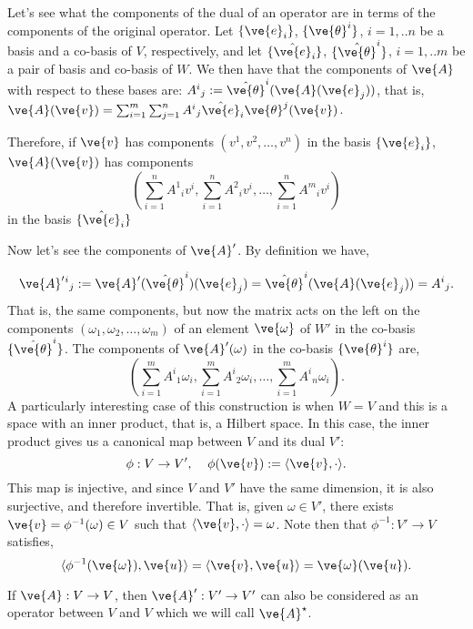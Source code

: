 {Let's see what the components of the dual of an operator are in terms of
the components of the original operator. 
Let $\{\ve{e}_i\}$, $\{\ve{\theta}^i\}$, $i=1,..n$ be a basis and a co-basis of $V$, respectively, and let $\{\hat{\ve{e}}_i\}$, $\{\hat{\ve{\theta}}^i\}$, 
$i=1,..m$
be a pair of basis and co-basis of $W$.
We then have that the components of $\ve{A}$ with respect to these bases
are: 
$A^i{}_j := \hat{\ve{\theta}}^i(\ve{A}(\ve{e}_j))$, 
that is,
$\ve{A}(\ve{v}) = 
\sum_{i=1}^{m} \sum_{j=1}^{n} A^i{}_j \hat{\ve{e}}_i\ve{\theta}^j(\ve{v})$.

Therefore, if $\ve{v}$ has components $(v^1,v^2,\dots,v^n)$ in the 
basis $\{\ve{e}_i\}$, $\ve{A}(\ve{v})$ has components 
\[
\left(\sum_{i=1}^{n} A^1{}_iv^i, \sum_{i=1}^{n} A^2{}_iv^i,\dots,\sum_{i=1}^{n} A^m{}_iv^i\right)
\]
%
 in the basis $\{\hat{\ve{e}}_i\}$

Now let's see the components of $\ve{A}'$. 
By definition we have,

\[
\ve{A}'{}^i{}_j := \ve{A}'(\hat{\ve{\theta}}^i)(\ve{e}_j) 
                  =  \hat{\ve{\theta}}^i(\ve{A}(\ve{e}_j)) = A^i{}_j.
\]
That is, the same components, but now the matrix acts on the left on
the components $(\omega_1,\omega_2,\dots, \omega_m)$ of an element 
$\ve{\omega}$ of $W'$ in the co-basis $\{\hat{\ve{\theta}}^i\}$.
The components of $\ve{A}'(\omega)$ in the co-basis $\{\ve{\theta}^i\}$ are,
\[ 
\left(\sum_{i=1}^{m}A^i{}_1\omega_i, \sum_{i=1}^{m}A^i{}_2\omega_i,\dots,\sum_{i=1}^{m}A^i{}_n\omega_i\right).
\]
%
A particularly interesting case of this construction is when
$W=V$ and this is a space with an inner product, that is, a 
Hilbert space. In this case, the inner product gives us a canonical map between
$V$ and its dual $V'$:
\begin{equation}
  \label{eq:mapa_canonico}
  \phi:V \to V', \;\;\;\; \phi(\ve{v}) := \langle \ve{v},\cdot \rangle.
\end{equation}
%
This map is injective, and since $V$ and $V'$ have the same dimension, it is also surjective, and therefore invertible. 
That is, given $\omega \in V'$, there exists $\ve{v}=\phi^{-1}(\omega) \in V$ such that $\langle \ve{v},\cdot \rangle = \omega$. 
Note then that $\phi^{-1}: V' \to V$ satisfies, 
\[
\langle \phi^{-1}(\ve{\omega}),\ve{u} \rangle = \langle \ve{v},\ve{u} \rangle = \ve{\omega}(\ve{u}).
\]


If $\ve{A}: V \to V$, then $\ve{A}': V' \to V'$
can also be considered as an operator between $V$ and $V$
which we will call $\ve{A}^{\star}$.


}
